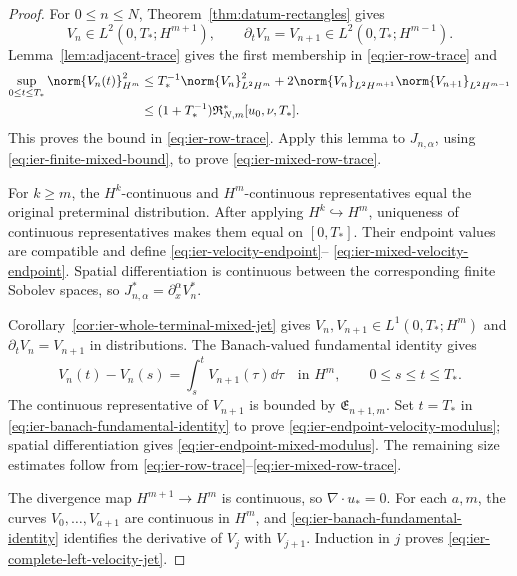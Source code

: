 \begin{proof}
For \(0\le n\le N\), Theorem~\ref{thm:datum-rectangles} gives
\[
 V_n\in L^2(0,T_*;H^{m+1}),
 \qquad
 \partial_tV_n=V_{n+1}\in L^2(0,T_*;H^{m-1}).
\]
Lemma~\ref{lem:adjacent-trace} gives the first membership in
\eqref{eq:ier-row-trace} and
\begin{align*}
 \sup_{0\le t\le T_*}\norm{V_n(t)}_{H^m}^2
 &\le T_*^{-1}\norm{V_n}_{L^2H^m}^2
 +2\norm{V_n}_{L^2H^{m+1}}\norm{V_{n+1}}_{L^2H^{m-1}}\\
 &\le(1+T_*^{-1})\mathfrak R_{N,m}^*[u_0,\nu,T_*].
\end{align*}
This proves the bound in \eqref{eq:ier-row-trace}.  Apply this lemma to
\(J_{n,\alpha}\), using \eqref{eq:ier-finite-mixed-bound}, to prove
\eqref{eq:ier-mixed-row-trace}.

For \(k\ge m\), the \(H^k\)-continuous and \(H^m\)-continuous
representatives equal the original preterminal distribution.  After applying
\(H^k\hookrightarrow H^m\), uniqueness of continuous representatives makes
them equal on \([0,T_*]\).  Their endpoint values are compatible and define
\eqref{eq:ier-velocity-endpoint}--%
\eqref{eq:ier-mixed-velocity-endpoint}.  Spatial differentiation is
continuous between the corresponding finite Sobolev spaces, so
\(J_{n,\alpha}^*=\partial_x^\alpha V_n^*\).

Corollary~\ref{cor:ier-whole-terminal-mixed-jet} gives
\(V_n,V_{n+1}\in L^1(0,T_*;H^m)\) and
\(\partial_tV_n=V_{n+1}\) in distributions.  The Banach-valued fundamental
identity gives
\begin{equation}
 V_n(t)-V_n(s)=\int_s^tV_{n+1}(\tau)\dd\tau
 \quad\text{in }H^m,
 \qquad0\le s\le t\le T_*.
 \label{eq:ier-banach-fundamental-identity}
\end{equation}
The continuous representative of \(V_{n+1}\) is bounded by
\(\mathfrak E_{n+1,m}\).  Set \(t=T_*\) in
\eqref{eq:ier-banach-fundamental-identity} to prove
\eqref{eq:ier-endpoint-velocity-modulus}; spatial differentiation gives
\eqref{eq:ier-endpoint-mixed-modulus}.  The remaining size estimates follow
from \eqref{eq:ier-row-trace}--\eqref{eq:ier-mixed-row-trace}.

The divergence map \(H^{m+1}\to H^m\) is continuous, so
\(\nabla\cdot u_*=0\).  For each \(a,m\), the curves
\(V_0,\ldots,V_{a+1}\) are continuous in \(H^m\), and
\eqref{eq:ier-banach-fundamental-identity} identifies the derivative of
\(V_j\) with \(V_{j+1}\).  Induction in \(j\) proves
\eqref{eq:ier-complete-left-velocity-jet}.
\end{proof}

